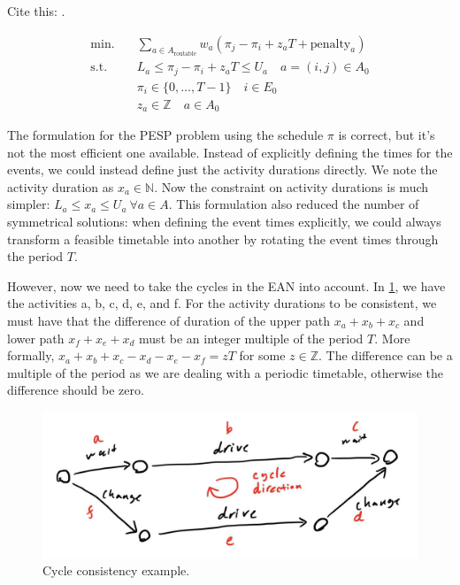 \documentclass[english, 12pt, a4paper, sci, utf8, a-2b, online]{aaltothesis}
\newcommand{\N}{\mathbb{N}}
\newcommand{\Z}{\mathbb{Z}}
\begin{document}

Cite this: \cite{schiewe2020periodic}.

\begin{align}
    \textrm{min.} \quad  &\sum_{a \in A_\text{routable}} w_{a} (\pi_j-\pi_i+z_aT + \text{penalty}_a) \\
    \textrm{s.t.} \quad &L_a \leq \pi_j-\pi_i+z_aT  \leq U_a \quad a =(i,j)\in A_0 \\
    &\pi_i \in \{0, \dots, T-1\} \quad i \in E_0\\
    &z_a \in \Z \quad a \in A_0
\end{align}

The formulation for the PESP problem using the schedule $\pi$ is correct, but it's not the most efficient one available. Instead of explicitly defining the times for the events, we could instead define just the activity durations directly. We note the activity duration as $x_a \in \N$. Now the constraint on activity durations is much simpler: $L_a \leq x_a \leq U_a\ \forall a \in A$. This formulation also reduced the number of symmetrical solutions: when defining the event times explicitly, we could always transform a feasible timetable into another by rotating the event times through the period $T$.

However, now we need to take the cycles in the EAN into account. In \cref{fig:cycle-example}, we have the activities a, b, c, d, e, and f. For the activity durations to be consistent, we must have that the difference of duration of the upper path $x_a + x_b + x_c$ and lower path $x_f + x_e + x_d$ must be an integer multiple of the period $T$. More formally, $x_a + x_b + x_c - x_d - x_e - x_f = zT$ for some $z\in \Z$. The difference can be a multiple of the period as we are dealing with a periodic timetable, otherwise the difference should be zero.

\begin{figure}
    \centering
    \includegraphics[width=\textwidth]{figures/cycle-basis-demo.jpg}
    \caption{Cycle consistency example.}
    \label{fig:cycle-example}
\end{figure}
\end{document}

